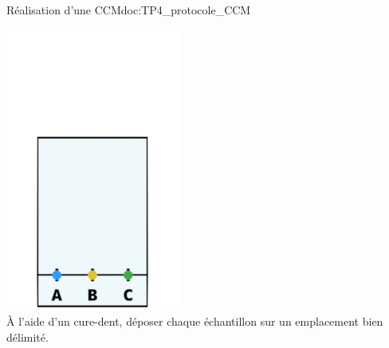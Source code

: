 \begin{doc}{Réalisation d'une CCM}{doc:TP4_protocole_CCM}
\begin{multicols}{3}
    \begin{center}
      \includegraphics[height=0.2\textheight]{images/chimie/CCM/CCM_protocole0003.png} \\      
      À l'aide d'un cure-dent, déposer chaque échantillon sur un emplacement bien délimité.
    \end{center}
  \end{multicols}
  
  \bigskip
  

\end{doc}
